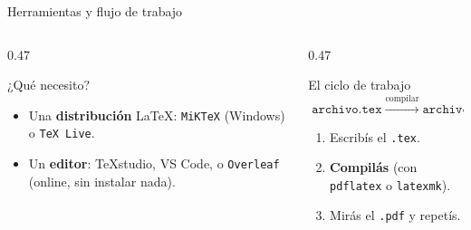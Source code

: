 \documentclass[10pt,aspectratio=169]{beamer}
\begin{document}
\begin{frame}{Herramientas y flujo de trabajo}
  \begin{columns}[T]
    \begin{column}{0.47\textwidth}
      \begin{block}{¿Qué necesito?}
        \begin{itemize}
          \item Una \textbf{distribución} LaTeX: \texttt{MiKTeX} (Windows) o
            \texttt{TeX~Live}.
          \item Un \textbf{editor}: TeXstudio, VS Code, o \texttt{Overleaf}
            (online, sin instalar nada).
        \end{itemize}
      \end{block}
    \end{column}
    \hspace{0.04\textwidth}
    \begin{column}{0.47\textwidth}
      \begin{block}{El ciclo de trabajo}
        \[ \texttt{archivo.tex} \;\xrightarrow{\text{compilar}}\; \texttt{archivo.pdf} \]
        \begin{enumerate}
          \item Escribís el \texttt{.tex}.
          \item \textbf{Compilás} (con \texttt{pdflatex} o \texttt{latexmk}).
          \item Mirás el \texttt{.pdf} y repetís.
        \end{enumerate}
      \end{block}
    \end{column}
  \end{columns}
\end{frame}
\end{document}
